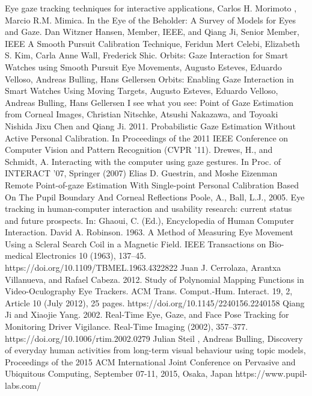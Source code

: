 \begin{thebibliography}{00}
   Eye gaze tracking techniques for interactive applications, Carlos H. Morimoto , Marcio R.M. Mimica.
   In the Eye of the Beholder: A Survey of Models for Eyes and Gaze. Dan Witzner Hansen, Member, IEEE, and Qiang Ji, Senior Member, IEEE
   A Smooth Pursuit Calibration Technique, Feridun  Mert  Celebi, Elizabeth S.  Kim, Carla  Anne  Wall, Frederick Shic.
   Orbits: Gaze Interaction for Smart Watches using Smooth Pursuit Eye Movements, Augusto Esteves, Eduardo Velloso, Andreas Bulling, Hans Gellersen
  Orbits: Enabling Gaze Interaction in Smart Watches Using Moving Targets, Augusto Esteves, Eduardo Velloso, Andreas Bulling, Hans Gellersen
  I see what you see: Point of Gaze Estimation from Corneal Images, Christian Nitschke, Atsushi Nakazawa, and Toyoaki Nishida
  Jixu Chen and Qiang Ji. 2011. Probabilistic Gaze Estimation Without Active Personal Calibration. In Proceedings of the 2011 IEEE Conference on Computer Vision and Pattern Recognition (CVPR '11).
  Drewes, H., and Schmidt, A. Interacting with the computer using gaze gestures. In Proc. of INTERACT '07, Springer (2007)
  Elias D. Guestrin, and Moshe Eizenman Remote Point-of-gaze Estimation With Single-point Personal Calibration Based On The Pupil Boundary And Corneal Reflections
  Poole, A., Ball, L.J., 2005. Eye tracking in human-computer interaction and usability research: current status and future prospects. In: Ghaoui, C. (Ed.), Encyclopedia of Human Computer Interaction.
  David A. Robinson. 1963. A Method of Measuring Eye Movement Using a Scleral Search Coil in a Magnetic Field. IEEE Transactions on Bio-medical Electronics 10 (1963), 137–45. https://doi.org/10.1109/TBMEL.1963.4322822
  Juan J. Cerrolaza, Arantxa Villanueva, and Rafael Cabeza. 2012. Study of Polynomial Mapping Functions in Video-Oculography Eye
Trackers. ACM Trans. Comput.-Hum. Interact. 19, 2, Article 10 (July 2012), 25 pages. https://doi.org/10.1145/2240156.2240158
  Qiang Ji and Xiaojie Yang. 2002. Real-Time Eye, Gaze, and Face Pose Tracking for Monitoring Driver Vigilance. Real-Time Imaging (2002), 357–377. https://doi.org/10.1006/rtim.2002.0279
  Julian Steil , Andreas Bulling, Discovery of everyday human activities from long-term visual behaviour using topic models, Proceedings of the 2015 ACM International Joint Conference on Pervasive and Ubiquitous Computing, September 07-11, 2015, Osaka, Japan 
  https://www.pupil-labs.com/
  \end{thebibliography}


